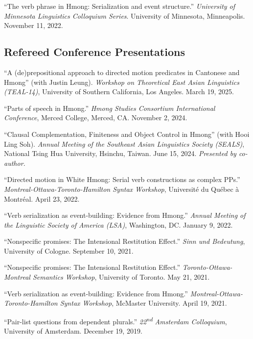 \documentclass[11pt,oneside,letterpaper]{johnstoncv}
\begin{document}
\begin{entries}
\Pub ``The verb phrase in Hmong: Serialization and event structure.'' \textit{University of Minnesota Linguistics Colloquium Series}. University of Minnesota, Minneapolis. November 11, 2022.


\subsection{Refereed Conference Presentations}

\Pub ``A (de)prepositional approach to directed motion predicates in Cantonese and Hmong'' (with Justin Leung). \textit{Workshop on Theoretical East Asian Linguistics (TEAL-14)}, University of Southern California, Los Angeles. March 19, 2025.

\Pub ``Parts of speech in Hmong.'' \textit{Hmong Studies Consortium International Conference}, Merced College, Merced, CA. November 2, 2024.

\Pub ``Clausal Complementation, Finiteness and Object Control in Hmong'' (with Hooi Ling Soh). \textit{Annual Meeting of the Southeast Asian Linguistics Society (SEALS)}, National Tsing Hua University, Hsinchu, Taiwan. June 15, 2024. \emph{Presented by co-author.}

\Pub ``Directed motion in White Hmong: Serial verb constructions as complex PPs.'' \textit{Montreal-Ottawa-Toronto-Hamilton Syntax Workshop}, Universit\'e du Qu\'ebec \`a Montr\'eal. April 23, 2022.

\Pub ``Verb serialization as event-building: Evidence from Hmong.'' \textit{Annual Meeting of the Linguistic Society of America (LSA)}, Washington, DC. January 9, 2022.

\Pub ``Nonspecific promises: The Intensional Restitution Effect.'' \textit{Sinn und Bedeutung}, University of Cologne. September 10, 2021.

\Pub ``Nonspecific promises: The Intensional Restitution Effect.'' \textit{Toronto-Ottawa-Montreal Semantics Workshop}, University of Toronto. May 21, 2021.

\Pub ``Verb serialization as event-building: Evidence from Hmong.'' \textit{Montreal-Ottawa-Toronto-Hamilton Syntax Workshop}, McMaster University. April 19, 2021.

\Pub ``Pair-list questions from dependent plurals.'' \textit{22\textsuperscript{nd} Amsterdam Colloquium}, University of Amsterdam. December 19, 2019.


\end{entries}
\end{document}
